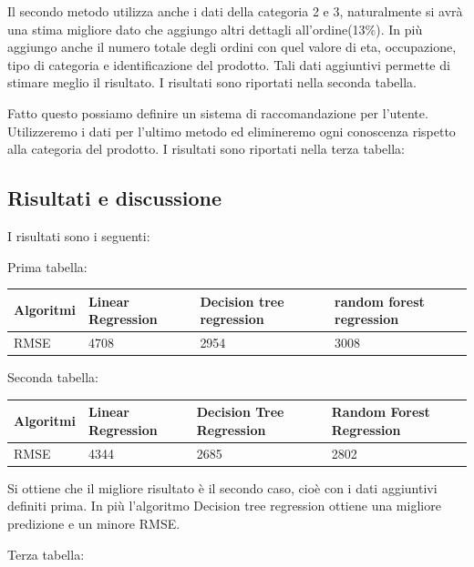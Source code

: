 \documentclass{article}
\begin{document}
Il secondo metodo utilizza anche i dati della categoria 2 e 3, naturalmente si avrà una stima migliore dato che aggiungo altri dettagli all'ordine(13\%). In più aggiungo anche il numero totale degli ordini con quel valore di eta, occupazione, tipo di categoria e identificazione del prodotto. Tali dati aggiuntivi permette di stimare meglio il risultato. I risultati sono riportati nella seconda tabella.


Fatto questo possiamo definire un sistema di raccomandazione per l'utente. Utilizzeremo i dati per l'ultimo metodo ed elimineremo ogni conoscenza rispetto alla categoria del prodotto. I risultati sono riportati nella terza tabella:



\subsection{Risultati e discussione}
I risultati sono i seguenti:

Prima tabella:

\begin{tabular}{|p{}|p{}|p{}|p{}|}
\hline
Algoritmi &Linear Regression          & Decision tree regression         &random forest regression      \\
\hline
RMSE     & 4708     & 2954                & 3008           \\
\hline
\end{tabular}

Seconda tabella:

\begin{tabular}{|p{}|p{}|p{}|p{}|}
\hline
Algoritmi &Linear Regression          & Decision Tree Regression         &Random Forest Regression      \\
\hline
RMSE &4344 &2685 &2802\\
\hline
\end{tabular}

Si ottiene che il migliore risultato è il secondo caso, cioè con i dati aggiuntivi definiti  prima. In più l'algoritmo  Decision tree regression ottiene una migliore predizione e un minore RMSE.

Terza tabella: 
\end{document}
